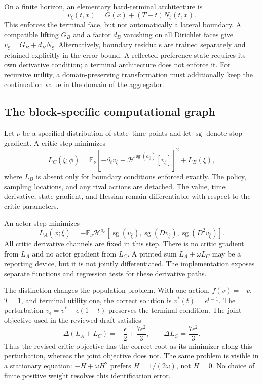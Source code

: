 \documentclass[ecta,draft]{econsocart}
\theoremstyle{definition}
\theoremstyle{remark}
\newcommand{\E}{\mathbb E}
\newcommand{\HH}{\mathcal H}
\newcommand{\sg}{\operatorname{sg}}
\begin{document}
On a finite horizon, an elementary hard-terminal architecture is
\begin{equation}\label{eq:terminal}
 v_\xi(t,x)=G(x)+(T-t)N_\xi(t,x).
\end{equation}
This enforces the terminal face, but not automatically a lateral boundary. A compatible lifting $G_B$ and a factor $d_B$ vanishing on all Dirichlet faces give $v_\xi=G_B+d_BN_\xi$. Alternatively, boundary residuals are trained separately and retained explicitly in the error bound. A reflected preference state requires its own derivative condition; a terminal architecture does not enforce it. For recursive utility, a domain-preserving transformation must additionally keep the continuation value in the domain of the aggregator.

\subsection{The block-specific computational graph}
Let $\nu$ be a specified distribution of state--time points and let $\sg$ denote stop-gradient. A critic step minimizes
\begin{equation}\label{eq:criticloss}
 L_C(\xi;\bar\phi)=\E_\nu\left[-\partial_t v_\xi-
                 \HH^{\sg(a_{\bar\phi})}[v_\xi]\right]^2+L_B(\xi),
\end{equation}
where $L_B$ is absent only for boundary conditions enforced exactly. The policy, sampling locations, and any rival actions are detached. The value, time derivative, state gradient, and Hessian remain differentiable with respect to the critic parameters.

An actor step minimizes
\begin{equation}\label{eq:actorloss}
 L_A(\phi;\bar\xi)=-\E_\nu\HH^{a_\phi}
 [\sg(v_{\bar\xi}),\sg(Dv_{\bar\xi}),\sg(D^2v_{\bar\xi})].
\end{equation}
All critic derivative channels are fixed in this step. There is no critic gradient from $L_A$ and no actor gradient from $L_C$. A printed sum $L_A+\omega L_C$ may be a reporting device, but it is not jointly differentiated. The implementation exposes separate functions and regression tests for these derivative paths.

The distinction changes the population problem. With one action, $f(v)=-v$, $T=1$, and terminal utility one, the correct solution is $v^*(t)=e^{t-1}$. The perturbation $v_\epsilon=v^*-\epsilon(1-t)$ preserves the terminal condition. The joint objective used in the reviewed draft satisfies
\begin{equation}\label{eq:counterexample}
 \Delta(L_A+L_C)=-\frac\epsilon2+\frac{7\epsilon^2}{3},
 \qquad \Delta L_C=\frac{7\epsilon^2}{3}.
\end{equation}
Thus the revised critic objective has the correct root as its minimizer along this perturbation, whereas the joint objective does not. The same problem is visible in a stationary equation: $-H+\omega H^2$ prefers $H=1/(2\omega)$, not $H=0$. No choice of finite positive weight resolves this identification error.
\end{document}
